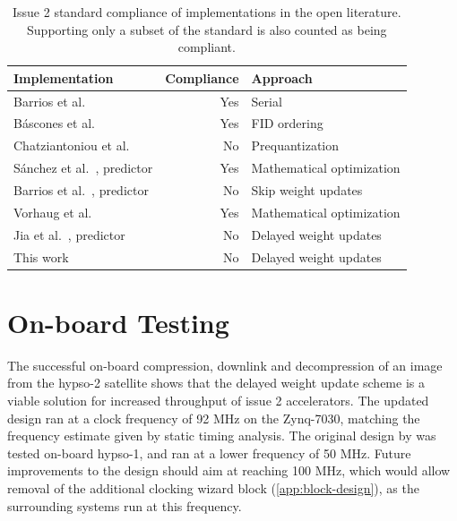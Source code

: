 \begin{table}[ht]
	\caption{Issue 2 standard compliance of implementations in the open literature. Supporting only a subset of the standard is also counted as being compliant.}
	\label{tab:issue2-compliance}
	\centering
	\begin{tabular}{lrl}
		\hline
		\textbf{Implementation}                                                                                      & \textbf{Compliance} & \textbf{Approach}         \\
		\hline
		Barrios et al.\ \cite{barriosHardwareImplementationCCSDS2021}                                                & Yes                 & Serial                    \\
		B\'ascones et al.\ \cite{basconesRealTimeFPGAImplementation2022}                                             & Yes                 & FID ordering              \\
		Chatziantoniou et al.\ \cite{chatziantoniouScalableDataRateNearLossless2022a}                                & No                  & Prequantization           \\
		S\'anchez et al.\ \cite{sanchezReducingDataDependencies2022, barriosRemovingDataDependencies2024}, predictor & Yes                 & Mathematical optimization \\
		Barrios et al.\ \cite{barriosRemovingDataDependencies2024}, predictor                                        & No                  & Skip weight updates       \\
		Vorhaug et al.\ \cite{vorhaugHyperspectralImageCompression2024}                                              & Yes                 & Mathematical optimization \\
		Jia et al.\ \cite{jiaRemovalFeedbackLoop2025}, predictor                                                     & No                  & Delayed weight updates    \\
		This work                                                                                                    & No                  & Delayed weight updates    \\
		\hline
	\end{tabular}
\end{table}

\section{On-board Testing}

The successful on-board compression, downlink and decompression of an image from the \acrshort{hypso}-2 satellite shows that the delayed weight update scheme is a viable solution for increased throughput of issue 2 accelerators. The updated design ran at a clock frequency of 92 MHz on the Zynq-7030, matching the frequency estimate given by static timing analysis. The original design by \citeauthor{vorhaugHyperspectralImageCompression2024} was tested on-board \acrshort{hypso}-1, and ran at a lower frequency of 50 MHz. Future improvements to the design should aim at reaching 100 MHz, which would allow removal of the additional clocking wizard block (\autoref{app:block-design}), as the surrounding systems run at this frequency.

